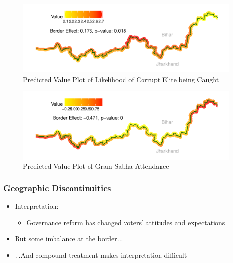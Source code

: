 \documentclass[xcolor=x11names,compress]{beamer}\usepackage[]{graphicx}\usepackage[]{color}
\makeatletter
\def\maxwidth{ %
  \ifdim\Gin@nat@width>\linewidth
    \linewidth
  \else
    \Gin@nat@width
  \fi
}
\renewcommand{\(}{\begin{columns}}
\renewcommand{\)}{\end{columns}}
\newcommand{\<}[1]{\begin{column}{#1}}
\renewcommand{\>}{\end{column}}
\makeatother
\begin{document}
\begin{frame}
\begin{figure}
\includegraphics[width=\maxwidth]{figure/rdd_map_accountability_elite-1} \caption[Predicted Value Plot of Likelihood of Corrupt Elite being Caught]{Predicted Value Plot of Likelihood of Corrupt Elite being Caught}\label{fig:rdd_map_accountability_elite}
\end{figure}
\end{frame}

\begin{frame}
\begin{figure}
\includegraphics[width=\maxwidth]{figure/rdd_map_sabha_att-1} \caption[Predicted Value Plot of Gram Sabha Attendance]{Predicted Value Plot of Gram Sabha Attendance}\label{fig:rdd_map_sabha_att}
\end{figure}
\end{frame}

\begin{frame}
\frametitle{Geographic Discontinuities}
\begin{itemize}
\item Interpretation:
\begin{itemize}
\item Governance reform has changed voters' attitudes and expectations
\end{itemize}
\pause
\item But some imbalance at the border...
\pause
\item ...And compound treatment makes interpretation difficult
\end{itemize}
\end{frame}
\end{document}

